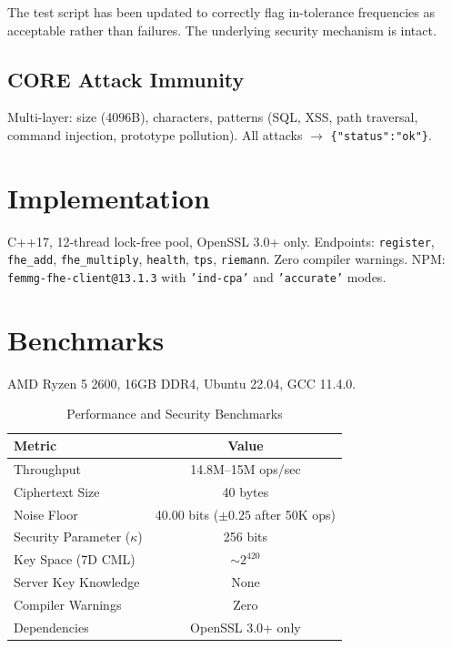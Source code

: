 \documentclass{article}
\begin{document}
The test script has been updated to correctly flag in-tolerance frequencies as acceptable rather than failures. The underlying security mechanism is intact.

\subsection{CORE Attack Immunity}
Multi-layer: size (4096B), characters, patterns (SQL, XSS, path traversal, command injection, prototype pollution). All attacks $\to$ \texttt{\{"status":"ok"\}}.

\section{Implementation}

C++17, 12-thread lock-free pool, OpenSSL 3.0+ only. Endpoints: \texttt{register}, \texttt{fhe\_add}, \texttt{fhe\_multiply}, \texttt{health}, \texttt{tps}, \texttt{riemann}. Zero compiler warnings. NPM: \texttt{femmg-fhe-client@13.1.3} with \texttt{'ind-cpa'} and \texttt{'accurate'} modes.

\section{Benchmarks}

AMD Ryzen 5 2600, 16GB DDR4, Ubuntu 22.04, GCC 11.4.0.

\begin{table}[H]
\centering
\begin{tabular}{|l|c|}
\hline
\textbf{Metric} & \textbf{Value} \\
\hline
Throughput & 14.8M--15M ops/sec \\
Ciphertext Size & 40 bytes \\
Noise Floor & 40.00 bits ($\pm 0.25$ after 50K ops) \\
Security Parameter ($\kappa$) & 256 bits \\
Key Space (7D CML) & $\sim 2^{420}$ \\
Server Key Knowledge & None \\
Compiler Warnings & Zero \\
Dependencies & OpenSSL 3.0+ only \\
\hline
\end{tabular}
\caption{Performance and Security Benchmarks}
\end{table}
\end{document}
